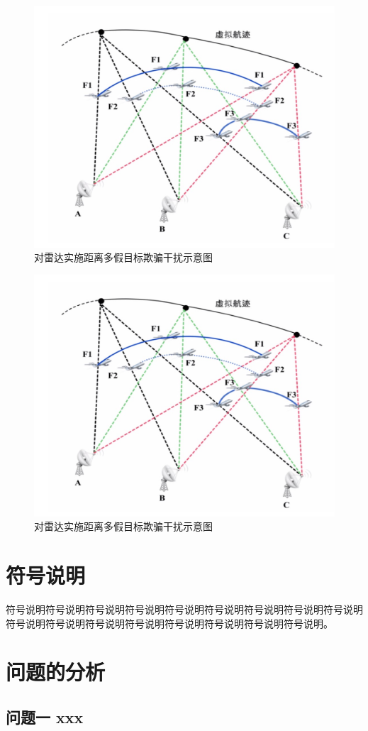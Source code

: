 \documentclass[bwprint]{gmcmthesis}
\numberwithin{figure}{section}
\begin{document}
\begin{figure}[!h]
\centering
\includegraphics[width=.7\textwidth]{test.jpg}
\caption{对雷达实施距离多假目标欺骗干扰示意图}
\label{fig1}
\end{figure}

\begin{figure}[!h]
\centering
\includegraphics[width=.7\textwidth]{test.jpg}
\caption{对雷达实施距离多假目标欺骗干扰示意图}
\label{fig1}
\end{figure}
\section{符号说明}
符号说明符号说明符号说明符号说明符号说明符号说明符号说明符号说明符号说明符号说明符号说明符号说明符号说明符号说明符号说明符号说明符号说明。
\section{问题的分析}
\subsection{问题一 xxx}
\end{document}

